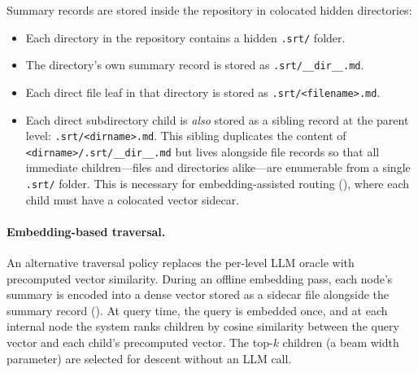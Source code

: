 

Summary records are stored inside the repository in colocated hidden directories:
\begin{itemize}[nosep]
    \item Each directory in the repository contains a hidden \texttt{.srt/} folder.
    \item The directory's own summary record is stored as \texttt{.srt/\_\_dir\_\_.md}.
    \item Each direct file leaf in that directory is stored as \texttt{.srt/<filename>.md}.
    \item Each direct subdirectory child is \emph{also} stored as a sibling record at the parent level: \texttt{.srt/<dirname>.md}. This sibling duplicates the content of \texttt{<dirname>/.srt/\_\_dir\_\_.md} but lives alongside file records so that all immediate children---files and directories alike---are enumerable from a single \texttt{.srt/} folder. This is necessary for embedding-assisted routing (), where each child must have a colocated vector sidecar.
\end{itemize}


\paragraph{Embedding-based traversal.}
An alternative traversal policy replaces the per-level LLM oracle with precomputed vector similarity.
During an offline embedding pass, each node's summary is encoded into a dense vector stored as a sidecar file alongside the summary record ().
At query time, the query is embedded once, and at each internal node the system ranks children by cosine similarity between the query vector and each child's precomputed vector.
The top-$k$ children (a beam width parameter) are selected for descent without an LLM call.

